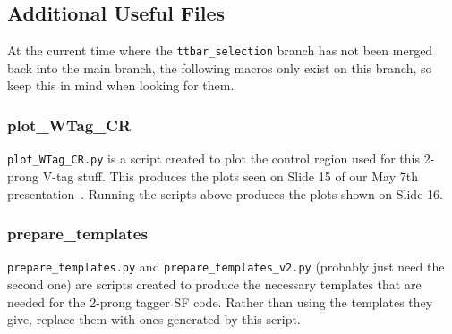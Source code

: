 \subsection{Additional Useful Files}
At the current time where the \verb|ttbar_selection| branch has not been merged back into the main branch, the following macros only exist on this branch, so keep this in mind when looking for them. 

\subsubsection{plot\_WTag\_CR}
\verb|plot_WTag_CR.py| is a script created to plot the control region used for this 2-prong V-tag stuff. This produces the plots seen on Slide 15 of our May 7th presentation~\cite{vqqhcc_twiki}. Running the scripts above produces the plots shown on Slide 16.

\subsubsection{prepare\_templates}
\verb|prepare_templates.py| and \verb|prepare_templates_v2.py| (probably just need the second one) are scripts created to produce the necessary templates that are needed for the 2-prong tagger SF code. Rather than using the templates they give, replace them with ones generated by this script.